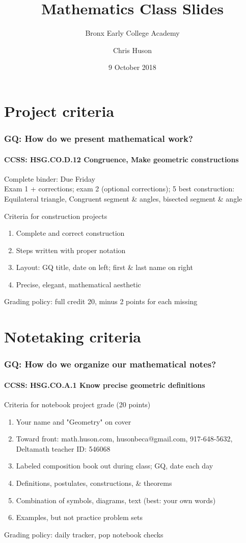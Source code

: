 \documentclass{beamer}
\title{Mathematics Class Slides}
\subtitle{Bronx Early College Academy}
\author{Chris Huson}
\date{9 October 2018}
\begin{document}
\frame{\titlepage}
\section[Outline]{}
\frame{\tableofcontents}

\section{Project criteria}
  \frame
  {
    \frametitle{GQ: How do we present mathematical work?}
    \framesubtitle{CCSS: HSG.CO.D.12 Congruence, Make geometric constructions}

    Complete binder: \alert{Due Friday}\\
    Exam 1 + corrections; exam 2 (optional corrections); 5 best construction:\\
    Equilateral triangle, Congruent segment \& angles, bisected segment \& angle
      \begin{block}{Criteria for construction projects}
      \begin{enumerate}
          \item Complete and correct construction
          \item Steps written with proper notation
          \item Layout: GQ title, date on left; first \& last name on right
          \item Precise, elegant, mathematical aesthetic
      \end{enumerate}
      \end{block}
    Grading policy: full credit 20, minus 2 points for each missing\\[5pt]
  }

\section{Notetaking criteria}
  \frame
  {
    \frametitle{GQ: How do we organize our mathematical notes?}
    \framesubtitle{CCSS: HSG.CO.A.1 Know precise geometric definitions}

    \begin{block}{Criteria for notebook project grade (20 points)}
    \begin{enumerate}
      \item Your name and "Geometry" on cover
      \item Toward front: math.huson.com, husonbeca@gmail.com, 917-648-5632, Deltamath teacher ID: 546068
      \item Labeled composition book out during class; GQ, date each day
      \item Definitions, postulates, constructions, \& theorems
      \item Combination of symbols, diagrams, text (best: your own words)
      \item Examples, but not practice problem sets
    \end{enumerate}
    \end{block}
    Grading policy: daily tracker, pop notebook checks
  }
\end{document}
